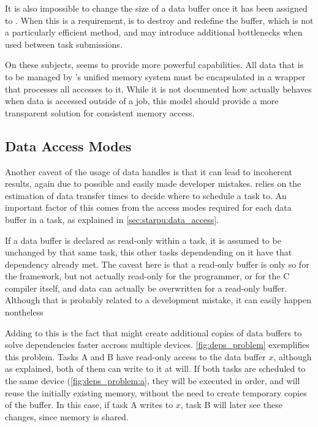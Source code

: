 \documentclass[main.tex]{subfiles}
\begin{document}
It is also impossible to change the size of a data buffer once it has been assigned to \starpu. When this is a requirement, is to destroy and redefine the buffer, which is not a particularly efficient method, and may introduce additional bottlenecks when used between task submissions.

On these subjects, \gama seems to provide more powerful capabilities. All data that is to be managed by \gama's unified memory system must be encapsulated in a wrapper that processes all accesses to it. While it is not documented how \gama actually behaves when data is accessed outside of a job, this model should provide a more transparent solution for consistent memory access.


\subsection{Data Access Modes}

Another caveat of the usage of data handles is that it can lead to incoherent results, again due to possible and easily made developer mistakes. \starpu relies on the estimation of data transfer times to decide where to schedule a task to. An important factor of this comes from the access modes required for each data buffer in a task, as explained in \cref{sec:starpu:data_access}.

If a data buffer is declared as read-only within a task, it is assumed to be unchanged by that same task, this other tasks dependending on it have that dependency already met.
The caveat here is that a read-only buffer is only so for the framework, but not actually read-only for the programmer, or for the C compiler itself, and data can actually be overwritten for a read-only buffer. Although that is probably related to a development mistake, it can easily happen nontheless

Adding to this is the fact that \starpu might create additional copies of data buffers to solve dependencies faster accross multiple devices. \cref{fig:deps_problem} exemplifies this problem. Tasks A and B have read-only access to the data buffer $x$, although as explained, both of them can write to it at will. If both tasks are scheduled to the same device (\cref{fig:deps_problem:a}, they will be executed in order, and \starpu will reuse the initially existing memory, without the need to create temporary copies of the buffer. In this case, if task A writes to $x$, task B will later see these changes, since memory is shared.
\end{document}
